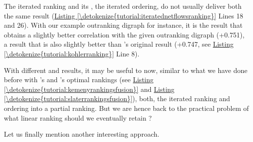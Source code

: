 \documentclass[a4paper,12pt,english]{sphinxhowto}
\begin{document}
The iterated  ranking and its , the iterated  ordering, do not usually deliver both the same result (\hyperref[\detokenize{tutorial:iteratednetflowsranking}]{Listing \ref{\detokenize{tutorial:iteratednetflowsranking}}} Lines 18 and 26). With our example outranking digraph  for instance, it is the  result that obtains a slightly better correlation with the given outranking digraph  (+0.751), a result that is also slightly better than ’s original result (+0.747, see \hyperref[\detokenize{tutorial:kohlerranking}]{Listing \ref{\detokenize{tutorial:kohlerranking}}} Line 8).

With different  and  results, it may be useful to  now, similar to what we have done before with ’s and ’s optimal rankings (see \hyperref[\detokenize{tutorial:kemenyrankingsfusion}]{Listing \ref{\detokenize{tutorial:kemenyrankingsfusion}}} and \hyperref[\detokenize{tutorial:slaterrankingsfusion}]{Listing \ref{\detokenize{tutorial:slaterrankingsfusion}}}), both, the iterated  ranking and ordering into a partial ranking. But we are hence back to the practical problem of what linear ranking should we eventually retain ?

Let us finally mention another interesting  approach.
\end{document}
